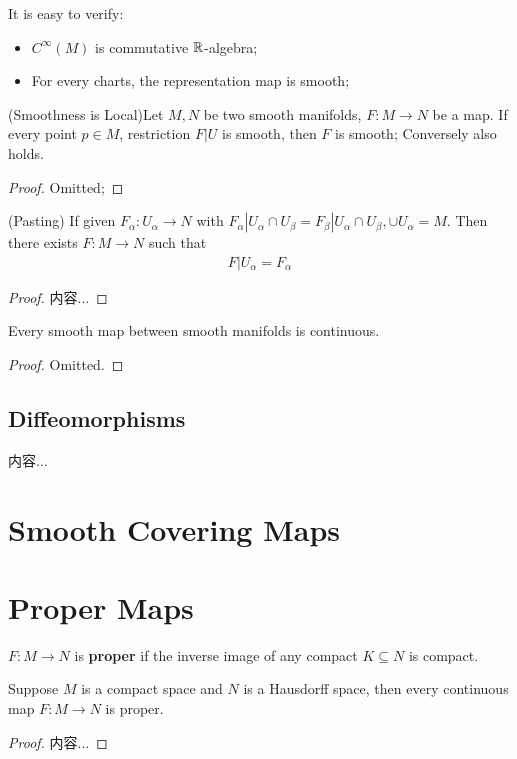 \documentclass[Total.tex]{subfiles}
\begin{document}
			It is easy to verify:
			\begin{itemize}
				\item $C^\infty(M)$ is commutative $\mathbb{R}$-algebra;
				\item For every charts, the representation map is smooth;
			\end{itemize}
			
			\begin{lemma}
				(Smoothness is Local)Let $M,N$ be two smooth manifolds, $F:M\rightarrow N$ be a map. If every point $p\in M$, restriction $F|U$ is smooth, then $F$ is smooth; Conversely also holds.
			\end{lemma}
			\begin{proof}
				Omitted;
			\end{proof}
			
			\begin{lemma}
				(Pasting) If given $F_\alpha:U_\alpha\rightarrow N$ with $F_\alpha|U_\alpha\cap U_\beta=F_\beta|U_\alpha\cap U_\beta,\cup U_\alpha=M$. Then there exists $F:M\rightarrow N$ such that
				\begin{gather*}
					F|U_\alpha=F_\alpha
				\end{gather*}
			\end{lemma}
			\begin{proof}
				内容...
			\end{proof}
			
			\begin{lemma}
				Every smooth map between smooth manifolds is continuous.
			\end{lemma}
			\begin{proof}
				Omitted.
			\end{proof}
			
			\subsection{Diffeomorphisms}
			\begin{Def}
				内容...
			\end{Def}
		\section{Smooth Covering Maps}
		\section{Proper Maps}
			\begin{Def}
				$F:M\rightarrow N$ is \textbf{proper} if the inverse image of any compact $K\subseteq N$ is compact.
			\end{Def}
			\begin{lemma}
				Suppose $M$ is a compact space and $N$ is a Hausdorff space, then every continuous map $F:M\rightarrow N$ is proper. 
			\end{lemma}
			\begin{proof}
				内容...
			\end{proof}
\end{document}
